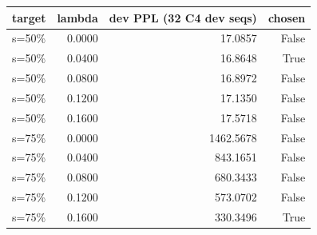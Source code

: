 \begin{tabular}{lrrr}
\toprule
target & lambda & dev PPL (32 C4 dev seqs) & chosen \\
\midrule
s=50\% & 0.0000 & 17.0857 & False \\
s=50\% & 0.0400 & 16.8648 & True \\
s=50\% & 0.0800 & 16.8972 & False \\
s=50\% & 0.1200 & 17.1350 & False \\
s=50\% & 0.1600 & 17.5718 & False \\
s=75\% & 0.0000 & 1462.5678 & False \\
s=75\% & 0.0400 & 843.1651 & False \\
s=75\% & 0.0800 & 680.3433 & False \\
s=75\% & 0.1200 & 573.0702 & False \\
s=75\% & 0.1600 & 330.3496 & True \\
\bottomrule
\end{tabular}

